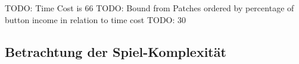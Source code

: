 TODO: Time Cost is 66
TODO: Bound from Patches ordered by percentage of button income in relation to time cost
TODO: 30










\subsection*{Betrachtung der Spiel-Komplexität}

